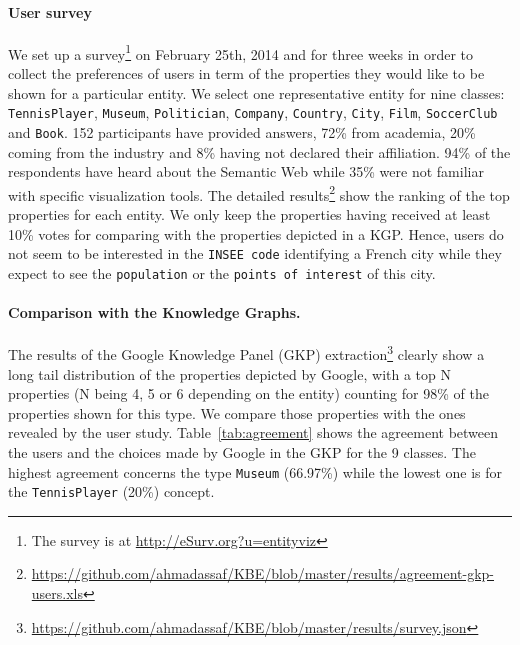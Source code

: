 \documentclass[onecolumn, crcready]{iosart2c}
\begin{document}
\paragraph{\textbf{User survey}}
\label{sec:survey}
We set up a survey\footnote{The survey is at \url{http://eSurv.org?u=entityviz}} on February 25th, 2014 and for three weeks in order to collect the preferences of users in term of the properties they would like to be shown for a particular entity. We select one representative entity for nine classes: \texttt{TennisPlayer}, \texttt{Museum}, \texttt{Politician}, \texttt{Company}, \texttt{Country}, \texttt{City}, \texttt{Film}, \texttt{SoccerClub} and \texttt{Book}. 152 participants have provided answers, 72\% from academia, 20\% coming from the industry and 8\% having not declared their affiliation. 94\% of the respondents have heard about the Semantic Web while 35\% were not familiar with specific visualization tools. The detailed results\footnote{\url{https://github.com/ahmadassaf/KBE/blob/master/results/agreement-gkp-users.xls}} show the ranking of the top properties for each entity. We only keep the properties having received at least 10\% votes for comparing with the properties depicted in a KGP. Hence, users do not seem to be interested in the \texttt{INSEE code} identifying a French city while they expect to see the \texttt{population} or the \texttt{points of interest} of this city.

\paragraph{\textbf{Comparison with the Knowledge Graphs.}}
\label{sec:comparison}
The results of the Google Knowledge Panel (GKP) extraction\footnote{\url{https://github.com/ahmadassaf/KBE/blob/master/results/survey.json}} clearly show a long tail distribution of the properties depicted by Google, with a top N properties (N being 4, 5 or 6 depending on the entity) counting for 98\% of the properties shown for this type. We compare those properties with the ones revealed by the user study. Table~\ref{tab:agreement} shows the agreement between the users and the choices made by Google in the GKP for the 9 classes. The highest agreement concerns the type \texttt{Museum} (66.97\%) while the lowest one is for the \texttt{TennisPlayer} (20\%) concept.
\end{document}
